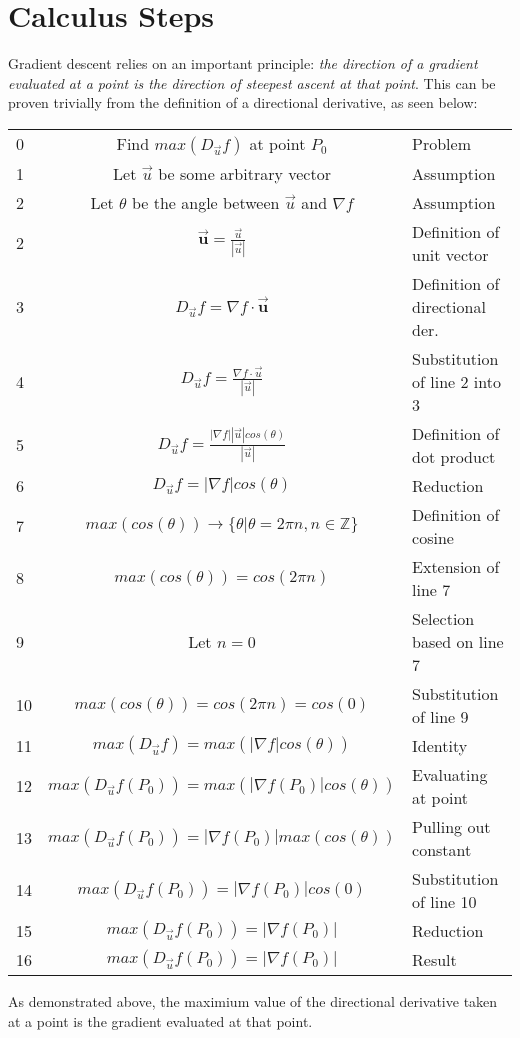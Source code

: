 \documentclass[11pt, a4paper]{article}
\newcommand\fvec[1]{\vec{\textbf{#1}}}
\begin{document}
\section{Calculus Steps}
Gradient descent relies on an important principle: \textit{the direction of a gradient evaluated at a 
point is the direction of steepest ascent at that point}. This can be proven trivially from the definition
of a directional derivative, as seen below:
\begin{center}
    \begin{tabular}{l | c | l}
        0 & Find $max(D_{\vec{u}}f)$ at point $P_0$ & Problem\\
        1 & Let $\vec{u}$ be some arbitrary vector & Assumption\\
        2 & Let $\theta$ be the angle between $\vec{u}$ and $\nabla f$ & Assumption \\
        2 & $\fvec{u} = \frac{\vec{u}}{|\vec{u}|}$ & Definition of unit vector\\
        3 & $D_{\vec{u}}f = \nabla f \cdot \fvec{u}$ & Definition of directional der.\\
        4 & $D_{\vec{u}}f = \frac{\nabla f \cdot \vec{u}}{|\vec{u}|}$ & Substitution of line 2 into 3 \\
        5 & $D_{\vec{u}}f = \frac{|\nabla f| |\vec{u}| cos(\theta)}{|\vec{u}|}$ & Definition of dot product \\
        6 & $D_{\vec{u}}f = |\nabla f| cos(\theta)$ & Reduction \\
        7 & $max(cos(\theta)) \rightarrow \{\theta | \theta = 2\pi n, n \in \mathbb{Z}\}$ & Definition of cosine \\
        8 & $max(cos(\theta)) = cos(2\pi n)$ & Extension of line 7 \\
        9 & Let $n = 0$ & Selection based on line 7 \\
        10 & $max(cos(\theta)) = cos(2 \pi n) = cos(0)$ & Substitution of line 9 \\
        11 & $max(D_{\vec{u}}f) = max(|\nabla f| cos(\theta))$ & Identity \\
        12 & $max(D_{\vec{u}}f(P_0)) = max(|\nabla f(P_0)| cos(\theta))$ & Evaluating at point \\
        13 & $max(D_{\vec{u}}f(P_0)) = |\nabla f(P_0)| max(cos(\theta))$ & Pulling out constant \\
        14 & $max(D_{\vec{u}}f(P_0)) = |\nabla f(P_0)| cos(0)$ & Substitution of line 10\\
        15 & $max(D_{\vec{u}}f(P_0)) = |\nabla f(P_0)|$ & Reduction \\
        16 & $max(D_{\vec{u}}f(P_0)) = |\nabla f(P_0)|$ & Result
    \end{tabular}
\end{center}
As demonstrated above, the maximium value of the directional derivative taken at a point is the gradient evaluated at that point.\\
\end{document}
